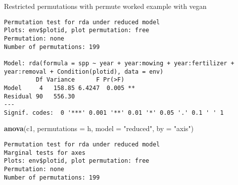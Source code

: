 \documentclass[10pt,ignorenonframetext,compress, aspectratio=169]{beamer}
\newenvironment{Shaded}{\begin{snugshade}}{\end{snugshade}}
\newcommand{\KeywordTok}[1]{\textcolor[rgb]{0.13,0.29,0.53}{\textbf{{#1}}}}
\newcommand{\DataTypeTok}[1]{\textcolor[rgb]{0.13,0.29,0.53}{{#1}}}
\newcommand{\DecValTok}[1]{\textcolor[rgb]{0.00,0.00,0.81}{{#1}}}
\newcommand{\StringTok}[1]{\textcolor[rgb]{0.31,0.60,0.02}{{#1}}}
\newcommand{\NormalTok}[1]{{#1}}
\begin{document}
\begin{frame}[fragile]{Restricted permutations with permute \textbar{}
worked example with vegan}

\tiny

\begin{Shaded}
\end{Shaded}

\begin{verbatim}
Permutation test for rda under reduced model
Plots: env$plotid, plot permutation: free
Permutation: none
Number of permutations: 199

Model: rda(formula = spp ~ year + year:mowing + year:fertilizer + year:removal + Condition(plotid), data = env)
         Df Variance      F Pr(>F)   
Model     4   158.85 6.4247  0.005 **
Residual 90   556.30                 
---
Signif. codes:  0 '***' 0.001 '**' 0.01 '*' 0.05 '.' 0.1 ' ' 1
\end{verbatim}

\begin{Shaded}
\begin{Highlighting}[]
\KeywordTok{anova}\NormalTok{(c1, }\DataTypeTok{permutations =} \NormalTok{h, }\DataTypeTok{model =} \StringTok{"reduced"}\NormalTok{, }\DataTypeTok{by =} \StringTok{"axis"}\NormalTok{)}
\end{Highlighting}
\end{Shaded}

\begin{verbatim}
Permutation test for rda under reduced model
Marginal tests for axes
Plots: env$plotid, plot permutation: free
Permutation: none
Number of permutations: 199


\end{verbatim}
\end{frame}
\end{document}
